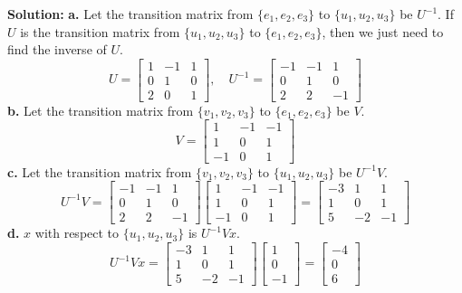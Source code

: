 \documentclass{article}
\begin{document}
\noindent\textbf{Solution:}
\newline\textbf{a.} Let the transition matrix from $\{e_1, e_2, e_3\}$ to $\{u_1, u_2, u_3\}$ be $U^{-1}$.
If $U$ is the transition matrix from $\{u_1, u_2, u_3\}$ to $\{e_1, e_2, e_3\}$, then we just need to find the inverse of $U$.
$$
U = \begin{bmatrix} 1 & -1 & 1 \\ 0 & 1 & 0 \\ 2 & 0 & 1 \end{bmatrix}
, \quad
U^{-1} = \begin{bmatrix} -1 & -1 & 1 \\ 0 & 1 & 0 \\ 2 & 2 & -1 \end{bmatrix}
$$
\textbf{b.} Let the transition matrix from $\{v_1, v_2, v_3\}$ to $\{e_1, e_2, e_3\}$ be $V$.
$$ V = \begin{bmatrix} 1 & -1 & -1 \\ 1 & 0 & 1 \\ -1 & 0 & 1 \end{bmatrix} $$
\textbf{c.} Let the transition matrix from $\{v_1, v_2, v_3\}$ to $\{u_1, u_2, u_3\}$ be $U^{-1}V$.
$$
U^{-1}V = \begin{bmatrix} -1 & -1 & 1 \\ 0 & 1 & 0 \\ 2 & 2 & -1 \end{bmatrix} \begin{bmatrix} 1 & -1 & -1 \\ 1 & 0 & 1 \\ -1 & 0 & 1 \end{bmatrix} 
= \begin{bmatrix} -3 & 1 & 1 \\ 1 & 0 & 1 \\ 5 & -2 & -1 \end{bmatrix}
$$
\textbf{d.} $x$ with respect to $\{u_1, u_2, u_3\}$ is $U^{-1}Vx$.
$$
U^{-1}Vx = \begin{bmatrix} -3 & 1 & 1 \\ 1 & 0 & 1 \\ 5 & -2 & -1 \end{bmatrix} \begin{bmatrix} 1 \\ 0 \\ -1 \end{bmatrix}
= \begin{bmatrix} -4 \\ 0 \\ 6 \end{bmatrix}
$$
\end{document}
